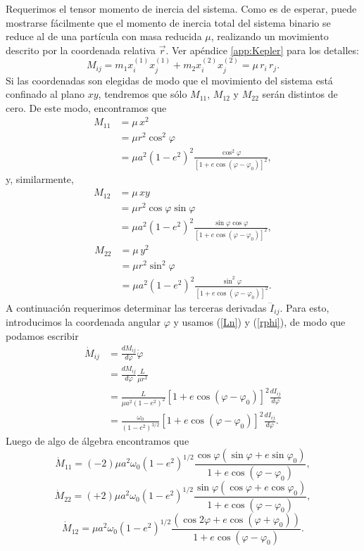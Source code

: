 Requerimos el tensor momento de inercia del sistema. Como es de esperar, puede mostrarse fácilmente que el momento de inercia total del sistema binario se reduce al de una partícula con masa reducida $\mu$, realizando un movimiento descrito por la coordenada relativa $\vec{r}$. Ver apéndice \ref{app:Kepler} para los detalles:
\begin{equation}
M_{ij}=m_1x_i^{(1)}x_j^{(1)}+m_2x_i^{(2)}x_j^{(2)}=\mu\, r_i\,r_j.
\end{equation}
Si las coordenadas son elegidas de modo que el movimiento del sistema está confinado al plano $xy$, tendremos que sólo $M_{11}$, $M_{12}$ y $M_{22}$ serán distintos de cero. De este modo, encontramos que
\begin{align}
M_{11} & = \mu\, x^2\\
& = \mu r^2\cos^2\varphi \\
& = \mu a^2(1-e^2)^2\frac{\cos^2\varphi}{\left[1+e\cos(\varphi-\varphi_0)\right]^2},
\end{align}
y, similarmente,
\begin{align}
M_{12} & = \mu\, xy \\
& = \mu r^2\cos\varphi\sin\varphi \\
& = \mu a^2(1-e^2)^2\frac{\sin\varphi\cos\varphi}{\left[1+e\cos(\varphi-\varphi_0)\right]^2},
\end{align}
\begin{align}
M_{22} & = \mu\, y^2 \\
& = \mu r^2\sin^2\varphi \\
& = \mu a^2(1-e^2)^2\frac{\sin^2\varphi}{\left[1+e\cos(\varphi-\varphi_0)\right]^2}.
\end{align}
A continuación requerimos determinar las terceras derivadas $\dddot{I}_{ij}$. Para esto, introducimos la coordenada angular $\varphi$ y usamos (\ref{Ln}) y (\ref{rphi}), de modo que podamos escribir
\begin{align}
\dot{M}_{ij} &= \frac{dM_{ij}}{d\varphi}\dot{\varphi} \\
&= \frac{dM_{ij}}{d\varphi}\frac{L}{\mu r^2} \\
&= \frac{L}{\mu a^2(1-e^2)^2}\left[1+e\cos(\varphi-\varphi_0)\right]^2 \frac{dI_{ij}}{d\varphi}\\
&= \frac{\omega_0}{(1-e^2)^{3/2}}\left[1+e\cos(\varphi-\varphi_0)\right]^2 \frac{dI_{ij}}{d\varphi}.
\end{align}
Luego de algo de álgebra encontramos que
\begin{equation}
\dot{M}_{11}=(-2)\mu a^2\omega_0\left(1-e^2\right)^{1/2}\frac{\cos\varphi(\sin\varphi+e\sin\varphi_0)}{1+e\cos(\varphi-\varphi_0)},
\end{equation}
\begin{equation}
\dot{M}_{22}=(+2)\mu a^2\omega_0\left(1-e^2\right)^{1/2}\frac{\sin\varphi(\cos\varphi+e\cos\varphi_0)}{1+e\cos(\varphi-\varphi_0)},
\end{equation}
\begin{equation}
\dot{M}_{12}=\mu a^2\omega_0\left(1-e^2\right)^{1/2}\frac{(\cos2\varphi+e\cos(\varphi+\varphi_0))}{1+e\cos(\varphi-\varphi_0)}.
\end{equation}

